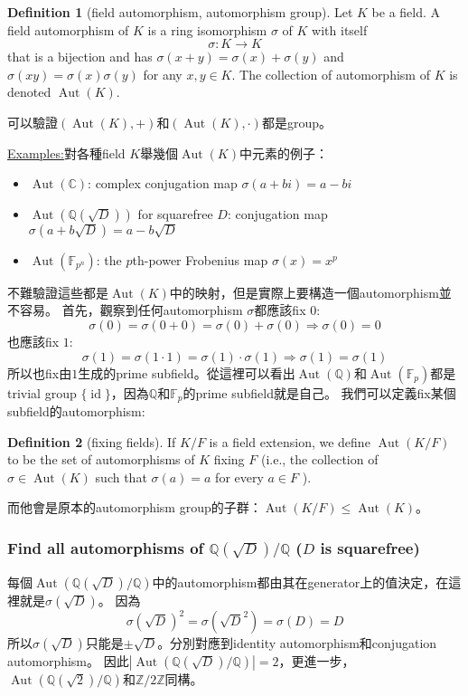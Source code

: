 \documentclass{article}
\theoremstyle{definition}
\newcommand{\ex}{\noindent\underline{Examples:}}
\newtheorem{dfn}{Definition}
\newcommand{\CC}{\mathbb C}
\newcommand{\FF}{\mathbb F}
\newcommand{\QQ}{\mathbb Q}
\newcommand{\ZZ}{\mathbb Z}
\DeclareMathOperator{\Aut}{Aut}
\DeclareMathOperator{\id}{id}
\begin{document}
\begin{dfn}[field automorphism, automorphism group]
	Let $K$ be a field. A field automorphism of $K$ is a ring isomorphism $\sigma$ of $K$ with itself 
	\[\sigma:K\to K\]
	that is a bijection and has $\sigma(x+y)=\sigma(x)+\sigma(y)$ and $\sigma(xy)=\sigma(x)\sigma(y)$ for any $x,y\in K$.
	The collection of automorphism of $K$ is denoted $\Aut(K)$.
\end{dfn}
可以驗證$(\Aut(K),+)$和$(\Aut(K),\cdot)$都是group。

\ex 對各種field $K$舉幾個$\Aut(K)$中元素的例子：

\begin{itemize}
	\item $\Aut(\CC)$: complex conjugation map $\sigma(a+bi)=a-bi$
	\item $\Aut(\QQ(\sqrt{D}))$ for squarefree $D$: conjugation map $\sigma(a+b\sqrt{D})=a-b\sqrt{D}$
	\item $\Aut(\FF_{p^n})$: the $p$th-power Frobenius map $\sigma(x)=x^p$ 
\end{itemize}

不難驗證這些都是$\Aut(K)$中的映射，但是實際上要構造一個automorphism並不容易。
首先，觀察到任何automorphism $\sigma$都應該fix $0$:
\[\sigma(0)=\sigma(0+0)=\sigma(0)+\sigma(0) \Rightarrow \sigma(0)=0\]
也應該fix $1$:
\[\sigma(1)=\sigma(1\cdot 1)=\sigma(1)\cdot\sigma(1) \Rightarrow \sigma(1)=\sigma(1)\]
所以也fix由$1$生成的prime subfield。從這裡可以看出$\Aut(\QQ)$和$\Aut(\FF_p)$都是
trivial group $\{\id\}$，因為$\QQ$和$\FF_p$的prime subfield就是自己。
我們可以定義fix某個subfield的automorphism:
\begin{dfn}[fixing fields]
	If $K/F$ is a field extension, we define $\Aut(K/F)$ to be the set of
automorphisms of $K$ fixing $F$ (i.e., the collection of $\sigma\in \Aut(K)$
such that $\sigma(a)=a$ for every $a\in F$ ).
\end{dfn}
而他會是原本的automorphism group的子群：$\Aut(K/F)\le \Aut(K)$。

\subsubsection*{Find all automorphisms of $\QQ(\sqrt{D})/\QQ$ ($D$ is squarefree)}
每個$\Aut(\QQ(\sqrt{D})/\QQ)$中的automorphism都由其在generator上的值決定，在這裡就是$\sigma(\sqrt{D})$。
因為
\[\sigma(\sqrt{D})^2=\sigma(\sqrt{D}^2)=\sigma(D)=D\]
所以$\sigma(\sqrt{D})$只能是$\pm\sqrt{D}$。分別對應到identity automorphism和conjugation automorphism。
因此$|\Aut(\QQ(\sqrt{D})/\QQ)|=2$，更進一步，$\Aut(\QQ(\sqrt{2})/\QQ)$和$\ZZ/2\ZZ$同構。
\end{document}
